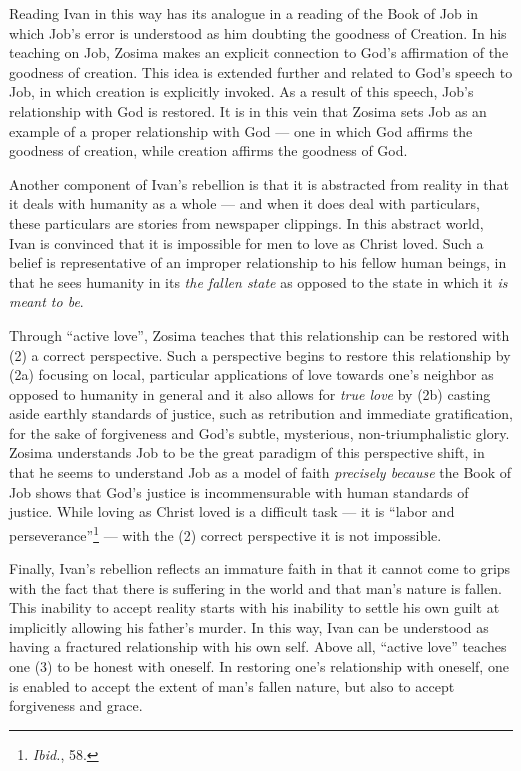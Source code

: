 Reading Ivan in this way has its analogue in a reading of the Book of Job in which Job's error is understood as him doubting the goodness of Creation. In his teaching on Job, Zosima makes an explicit connection to God's affirmation of the goodness of creation. This idea is extended further and related to God's speech to Job, in which creation is explicitly invoked. As a result of this speech, Job's relationship with God is restored. It is in this vein that Zosima sets Job as an example of a proper relationship with God --- one in which God affirms the goodness of creation, while creation affirms the goodness of God.

Another component of Ivan's rebellion is that it is abstracted from reality in that it deals with humanity as a whole --- and when it does deal with particulars, these particulars are stories from newspaper clippings. In this abstract world, Ivan is convinced that it is impossible for men to love as Christ loved. Such a belief is representative of an improper relationship to his fellow human beings, in that he sees humanity in its \emph{the fallen state} as opposed to the state in which it \emph{is meant to be}. 

Through ``active love'', Zosima teaches that this relationship can be restored with (2) a correct perspective. Such a perspective begins to restore this relationship by (2a) focusing on local, particular applications of love towards one's neighbor as opposed to humanity in general and it also allows for \emph{true love} by (2b) casting aside earthly standards of justice, such as retribution and immediate gratification, for the sake of forgiveness and God's subtle, mysterious, non-triumphalistic glory. Zosima understands Job to be the great paradigm of this perspective shift, in that he seems to understand Job as a model of faith \emph{precisely because} the Book of Job shows that God's justice is incommensurable with human standards of justice. While loving as Christ loved is a difficult task --- it is ``labor and perseverance''\footnote{\emph{Ibid.}, 58.} --- with the (2) correct perspective it is not impossible.

Finally, Ivan's rebellion reflects an immature faith in that it cannot come to grips with the fact that there is suffering in the world and that man's nature is fallen. This inability to accept reality starts with his inability to settle his own guilt at implicitly allowing his father's murder. In this way, Ivan can be understood as having a fractured relationship with his own self. Above all, ``active love'' teaches one (3) to be honest with oneself. In restoring one's relationship with oneself, one is enabled to accept the extent of man's fallen nature, but also to accept forgiveness and grace. 

